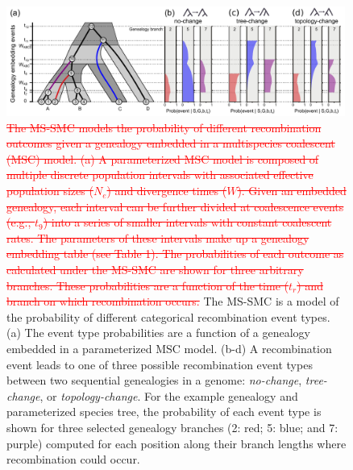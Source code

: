 \documentclass[11pt]{article}
\begin{document}
\begin{figure}
	\centering
	\includegraphics[width=0.99\textwidth]{figures/current/Fig4-embedding-with-probabilities.pdf}
	\caption{
		\textcolor{red}{ \sout{
		The MS-SMC models the probability of different recombination outcomes 
		given a genealogy embedded in a multispecies coalescent (MSC) model.
		(a) A parameterized MSC model is composed of multiple discrete population
		intervals with associated effective population sizes ($N_e$) and divergence 
		times ($W$). Given an embedded genealogy, each interval can be further divided 
		at coalescence events (e.g., $t_9$) into a series of smaller intervals
		with constant coalescent rates. The parameters of these intervals make up a 
		genealogy embedding table (see Table 1).
		The probabilities of each outcome as calculated under the MS-SMC 
		are shown for three arbitrary branches. 
		These probabilities are a function of the time ($t_r$) and branch 
		on which recombination occurs.	
		}}
		The MS-SMC is a model of the probability of different categorical
		recombination event types. (a) The event type probabilities are a 
		function of a genealogy embedded in a parameterized MSC model.
		(b-d) A recombination event leads to one of three possible recombination 
		event types between two sequential genealogies in a genome: 
		\emph{no-change}, \emph{tree-change}, or \emph{topology-change}.
		For the example genealogy and parameterized species tree, 
		the probability of each event type is shown for 
		three selected genealogy branches (2: red; 5: blue; and 7: purple) computed
		for each position along their branch lengths where recombination could occur.
	}
	\label{fig:edge-probabilities}
\end{figure}


\end{document}

